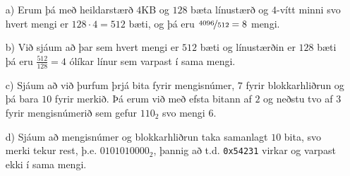 \documentclass{article}
\begin{document}
	\section{}
	\begin{itemize}
		\item[a)] Erum þá með heildarstærð $4$KB og $128$ bæta línustærð 
			og $4$-vítt minni svo hvert mengi er $128\cdot4 = 512$ bæti, 
			og þá eru $\nicefrac{4096}{512} = 8$ mengi.
		\item[b)] Við sjáum að þar sem hvert mengi er $512$ bæti og 
			línustærðin er $128$ bæti þá eru $\frac{512}{128} = 4$ ólíkar 
			línur sem varpast í sama mengi.
		\item[c)] Sjáum að við þurfum þrjá bita fyrir mengisnúmer, 
			$7$ fyrir blokkarhliðrun og þá bara $10$ fyrir merkið. Þá erum 
			við með efsta bitann af $2$ og neðstu tvo af $3$ fyrir 
			mengisnúmerið sem gefur $110_2$ svo mengi $6$.
		\item[d)] Sjáum að mengisnúmer og blokkarhliðrun taka samanlagt $10$ 
			bita, svo merki tekur rest, þ.e. $0101010000_2$, þannig að 
			t.d. \texttt{0x54231} virkar og varpast ekki í sama mengi.
	\end{itemize}
\end{document}

